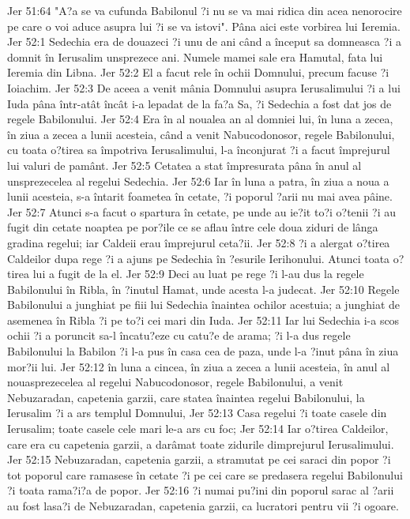 Jer 51:64  "A?a se va cufunda Babilonul ?i nu se va mai ridica din acea nenorocire pe care o voi aduce asupra lui ?i se va istovi". Pâna aici este vorbirea lui Ieremia.
Jer 52:1  Sedechia era de douazeci ?i unu de ani când a început sa domneasca ?i a domnit în Ierusalim unsprezece ani. Numele mamei sale era Hamutal, fata lui Ieremia din Libna.
Jer 52:2  El a facut rele în ochii Domnului, precum facuse ?i Ioiachim.
Jer 52:3  De aceea a venit mânia Domnului asupra Ierusalimului ?i a lui Iuda pâna într-atât încât i-a lepadat de la fa?a Sa, ?i Sedechia a fost dat jos de regele Babilonului.
Jer 52:4  Era în al noualea an al domniei lui, în luna a zecea, în ziua a zecea a lunii acesteia, când a venit Nabucodonosor, regele Babilonului, cu toata o?tirea sa împotriva Ierusalimului, l-a înconjurat ?i a facut împrejurul lui valuri de pamânt.
Jer 52:5  Cetatea a stat împresurata pâna în anul al unsprezecelea al regelui Sedechia.
Jer 52:6  Iar în luna a patra, în ziua a noua a lunii acesteia, s-a întarit foametea în cetate, ?i poporul ?arii nu mai avea pâine.
Jer 52:7  Atunci s-a facut o spartura în cetate, pe unde au ie?it to?i o?tenii ?i au fugit din cetate noaptea pe por?ile ce se aflau între cele doua ziduri de lânga gradina regelui; iar Caldeii erau împrejurul ceta?ii.
Jer 52:8  ?i a alergat o?tirea Caldeilor dupa rege ?i a ajuns pe Sedechia în ?esurile Ierihonului. Atunci toata o?tirea lui a fugit de la el.
Jer 52:9  Deci au luat pe rege ?i l-au dus la regele Babilonului în Ribla, în ?inutul Hamat, unde acesta l-a judecat.
Jer 52:10  Regele Babilonului a junghiat pe fiii lui Sedechia înaintea ochilor acestuia; a junghiat de asemenea în Ribla ?i pe to?i cei mari din Iuda.
Jer 52:11  Iar lui Sedechia i-a scos ochii ?i a poruncit sa-l încatu?eze cu catu?e de arama; ?i l-a dus regele Babilonului la Babilon ?i l-a pus în casa cea de paza, unde l-a ?inut pâna în ziua mor?ii lui.
Jer 52:12  în luna a cincea, în ziua a zecea a lunii acesteia, în anul al nouasprezecelea al regelui Nabucodonosor, regele Babilonului, a venit Nebuzaradan, capetenia garzii, care statea înaintea regelui Babilonului, la Ierusalim ?i a ars templul Domnului,
Jer 52:13  Casa regelui ?i toate casele din Ierusalim; toate casele cele mari le-a ars cu foc;
Jer 52:14  Iar o?tirea Caldeilor, care era cu capetenia garzii, a darâmat toate zidurile dimprejurul Ierusalimului.
Jer 52:15  Nebuzaradan, capetenia garzii, a stramutat pe cei saraci din popor ?i tot poporul care ramasese în cetate ?i pe cei care se predasera regelui Babilonului ?i toata rama?i?a de popor.
Jer 52:16  ?i numai pu?ini din poporul sarac al ?arii au fost lasa?i de Nebuzaradan, capetenia garzii, ca lucratori pentru vii ?i ogoare.
